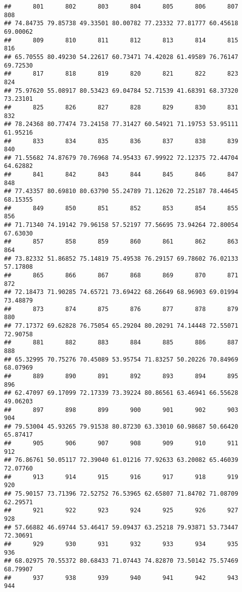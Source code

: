 \documentclass[
]{article}
\begin{document}
\begin{verbatim}
##      801      802      803      804      805      806      807      808 
## 74.84735 79.85738 49.33501 80.00782 77.23332 77.81777 60.45618 69.00062 
##      809      810      811      812      813      814      815      816 
## 65.70555 80.49230 54.22617 60.73471 74.42028 61.49589 76.76147 69.72530 
##      817      818      819      820      821      822      823      824 
## 75.97620 55.08917 80.53423 69.04784 52.71539 41.68391 68.37320 73.23101 
##      825      826      827      828      829      830      831      832 
## 78.24368 80.77474 73.24158 77.31427 60.54921 71.19753 53.95111 61.95216 
##      833      834      835      836      837      838      839      840 
## 71.55682 74.87679 70.76968 74.95433 67.99922 72.12375 72.44704 64.62882 
##      841      842      843      844      845      846      847      848 
## 77.43357 80.69810 80.63790 55.24789 71.12620 72.25187 78.44645 68.15355 
##      849      850      851      852      853      854      855      856 
## 71.71340 74.19142 79.96158 57.52197 77.56695 73.94264 72.80054 67.63030 
##      857      858      859      860      861      862      863      864 
## 73.82332 51.86852 75.14819 75.49538 76.29157 69.78602 76.02133 57.17808 
##      865      866      867      868      869      870      871      872 
## 72.18473 71.90285 74.65721 73.69422 68.26649 68.96903 69.01994 73.48879 
##      873      874      875      876      877      878      879      880 
## 77.17372 69.62828 76.75054 65.29204 80.20291 74.14448 72.55071 72.90758 
##      881      882      883      884      885      886      887      888 
## 65.32995 70.75276 70.45089 53.95754 71.83257 50.20226 70.84969 68.07969 
##      889      890      891      892      893      894      895      896 
## 62.47097 69.17099 72.17339 73.39224 80.86561 63.46941 66.55628 49.06203 
##      897      898      899      900      901      902      903      904 
## 79.53004 45.93265 79.91538 80.87230 63.33010 60.98687 50.66420 65.87417 
##      905      906      907      908      909      910      911      912 
## 76.86761 50.05117 72.39040 61.01216 77.92633 63.20082 65.46039 72.07760 
##      913      914      915      916      917      918      919      920 
## 75.90157 73.71396 72.52752 76.53965 62.65807 71.84702 71.08709 62.29571 
##      921      922      923      924      925      926      927      928 
## 57.66882 46.69744 53.46417 59.09437 63.25218 79.93871 53.73447 72.30691 
##      929      930      931      932      933      934      935      936 
## 68.02975 70.55372 80.68433 71.07443 74.82870 73.50142 75.57469 68.79907 
##      937      938      939      940      941      942      943      944 

\end{verbatim}
\end{document}
